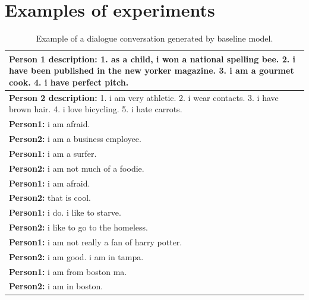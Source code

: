 \chapter{Examples of experiments}

\begin{table}[ht]
\centering
 \begin{tabular}{|p{14cm}|}
 \hline
 \textbf{Person 1 description:} 1. as a child, i won a national spelling bee. 2. i have been published in the new yorker magazine. 3. i am a gourmet cook. 4. i have perfect pitch. \\
 \hline
 \textbf{Person 2 description:} 1. i am very athletic. 2. i wear contacts. 3. i have brown hair. 4. i love bicycling. 5. i hate carrots. \\
 \hline
 \textbf{Person1:} i am afraid. \\
 \textbf{Person2:} i am a business employee.  \\ 
 \textbf{Person1:} i am a surfer. \\
 \textbf{Person2:} i am not much of a foodie. \\
 \textbf{Person1:} i am afraid. \\
 \textbf{Person2:} that is cool. \\
 \textbf{Person1:} i do. i like to starve. \\
 \textbf{Person2:} i like to go to the homeless. \\
 \textbf{Person1:} i am not really a fan of harry potter. \\
 \textbf{Person2:} i am good. i am in tampa. \\
 \textbf{Person1:} i am from boston ma. \\
 \textbf{Person2:} i am in boston. \\
 \hline
 \end{tabular}
 \caption{Example of a dialogue conversation generated by baseline model.}
\label{tab:baseline_experiment}
\end{table}

